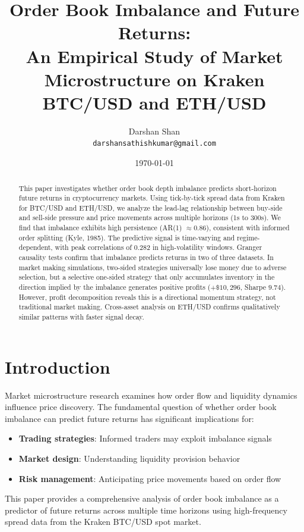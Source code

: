 \documentclass[12pt,a4paper]{article}
\title{\textbf{Order Book Imbalance and Future Returns:} \\
\large An Empirical Study of Market Microstructure on Kraken BTC/USD and ETH/USD}
\author{Darshan Shan \\
\small \texttt{darshansathishkumar@gmail.com}}
\date{\today}
\begin{document}
\maketitle

\begin{abstract}
This paper investigates whether order book depth imbalance predicts short-horizon future returns in cryptocurrency markets. Using tick-by-tick spread data from Kraken for BTC/USD and ETH/USD, we analyze the lead-lag relationship between buy-side and sell-side pressure and price movements across multiple horizons (1s to 300s). We find that imbalance exhibits high persistence (AR(1) $\approx 0.86$), consistent with informed order splitting (Kyle, 1985). The predictive signal is time-varying and regime-dependent, with peak correlations of 0.282 in high-volatility windows. Granger causality tests confirm that imbalance predicts returns in two of three datasets. In market making simulations, two-sided strategies universally lose money due to adverse selection, but a selective one-sided strategy that only accumulates inventory in the direction implied by the imbalance generates positive profits ($+\$10,296$, Sharpe $9.74$). However, profit decomposition reveals this is a directional momentum strategy, not traditional market making. Cross-asset analysis on ETH/USD confirms qualitatively similar patterns with faster signal decay.
\end{abstract}

\newpage

\tableofcontents
\newpage

\section{Introduction}

Market microstructure research examines how order flow and liquidity dynamics influence price discovery. The fundamental question of whether order book imbalance can predict future returns has significant implications for:
\begin{itemize}
    \item \textbf{Trading strategies}: Informed traders may exploit imbalance signals
    \item \textbf{Market design}: Understanding liquidity provision behavior
    \item \textbf{Risk management}: Anticipating price movements based on order flow
\end{itemize}

This paper provides a comprehensive analysis of order book imbalance as a predictor of future returns across multiple time horizons using high-frequency spread data from the Kraken BTC/USD spot market.
\end{document}
